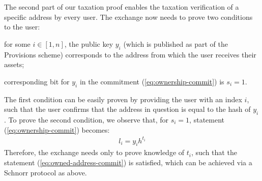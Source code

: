 The second part of our taxation proof enables the taxation verification of a
specific address by every user. The exchange now needs to prove two conditions
to the user:
\begin{inparaenum}[i)]
    \item for some $i \in [1, n]$, the public key $y_i$ (which is published as
        part of the Provisions scheme) corresponds to the address from which
        the user receives their assets;
    \item corresponding bit for $y_i$ in the commitment
        (\ref{eq:ownership-commit}) is $s_i = 1$.
\end{inparaenum}
The first condition can be easily proven by providing the user with an index
$i$, such that the user confirms that the address in question is equal to the
hash of $y_i$. To prove the second condition, we observe that, for $s_i = 1$,
statement (\ref{eq:ownership-commit}) becomes:
\begin{align}
    l_i = y_ih^{t_i} \label{eq:owned-address-commit}
\end{align}
Therefore, the exchange needs only to prove knowledge of $t_i$, such that the
statement (\ref{eq:owned-address-commit}) is satisfied, which can be achieved
via a Schnorr protocol as above.

